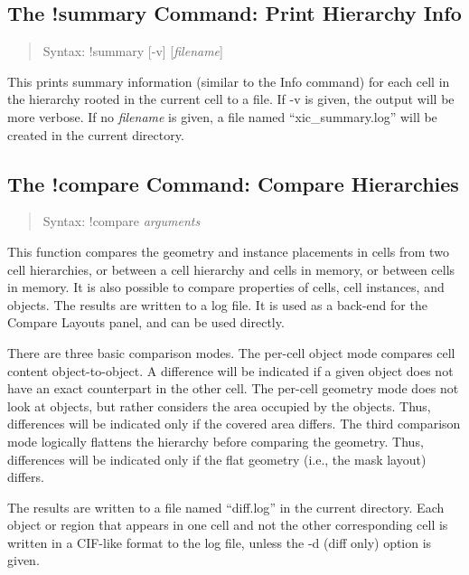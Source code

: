 \subsection{The {\cb !summary} Command: Print Hierarchy Info}
\begin{quote}
Syntax: {\vt !summary} [{\vt -v}] [{\it filename\/}]
\end{quote}
This prints summary information (similar to the {\cb Info} command)
for each cell in the hierarchy rooted in the current cell to a file. 
If {\vt -v} is given, the output will be more verbose.  If no {\it
filename} is given, a file named ``{\vt xic\_summary.log}'' will be
created in the current directory.

\subsection{The {\cb !compare} Command: Compare Hierarchies}
\label{cellcomp}
\begin{quote}
Syntax: {\vt !compare} {\it arguments}
\end{quote}
This function compares the geometry and instance placements in cells
from two cell hierarchies, or between a cell hierarchy and cells in
memory, or between cells in memory.  It is also possible to compare
properties of cells, cell instances, and objects.  The results are
written to a log file.  It is used as a back-end for the {\cb Compare
Layouts} panel, and can be used directly.

There are three basic comparison modes.  The per-cell object mode
compares cell content object-to-object.  A difference will be
indicated if a given object does not have an exact counterpart in the
other cell.  The per-cell geometry mode does not look at objects, but
rather considers the area occupied by the objects.  Thus, differences
will be indicated only if the covered area differs.  The third
comparison mode logically flattens the hierarchy before comparing the
geometry.  Thus, differences will be indicated only if the flat
geometry (i.e., the mask layout) differs.

The results are written to a file named ``{\vt diff.log}'' in the
current directory.  Each object or region that appears in one cell and
not the other corresponding cell is written in a CIF-like format to
the log file, unless the {\vt -d} (diff only) option is given.

